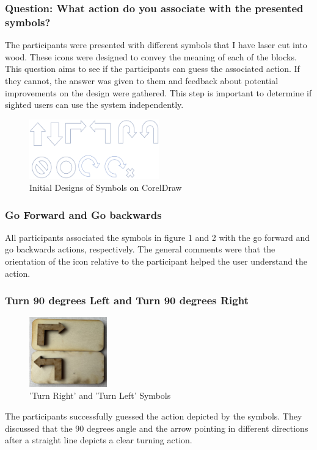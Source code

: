 \documentclass[oneside,%
                    author={Malak Hajji},
                    degree={BSc},
                    title={Designing An Accessible Computational Toolkit For Students},
                  subtitle={With Mixed Visual Abilities}]{dissertation}
\begin{document}
\subsubsection{Question: What action do you associate with the presented symbols?}
The participants were presented with different symbols that I have laser cut into wood. These icons were designed to convey the meaning of each of the blocks. This question aims to see if the participants can guess the associated action. If they cannot, the answer was given to them and feedback about potential improvements on the design were gathered. This step is important to determine if sighted users can use the system independently.
\FloatBarrier
\begin{figure}[h]
    \centering
    \includegraphics[width=0.5\textwidth]{thesis/design.eps}
    \caption{Initial Designs of Symbols on CorelDraw}
    \label{fig-design-initial}
\end{figure}
\FloatBarrier
\subsubsection{Go Forward and Go backwards}
All participants associated the symbols in figure 1 and 2 with the go forward and go backwards actions, respectively. The general comments were that the orientation of the icon relative to the participant helped the user understand the action. 

\subsubsection{Turn 90 degrees Left and Turn 90 degrees Right}
\FloatBarrier
\begin{figure}[h]
    \centering
    \includegraphics[width=0.3\textwidth]{thesis/turns.eps}
    \caption{'Turn Right' and 'Turn Left' Symbols}
    \label{fig-turn}
\end{figure}
\FloatBarrier
The participants successfully guessed the action depicted by the symbols. They discussed that the 90 degrees angle and the arrow pointing in different directions after a straight line depicts a clear turning action. 
\end{document}

